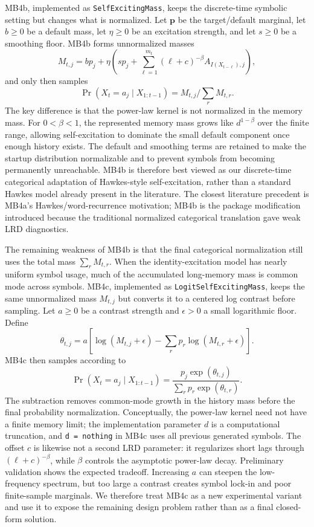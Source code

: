 \documentclass[journal]{IEEEtran}
\newcommand{\code}[1]{\texttt{#1}}
\newcommand{\vect}[1]{\boldsymbol{#1}}
\begin{document}
MB4b, implemented as \code{SelfExcitingMass}, keeps the discrete-time symbolic
setting but changes what is normalized. Let \(\vect{p}\) be the target/default
marginal, let $b\ge 0$ be a default mass, let \(\eta\ge 0\) be an excitation
strength, and let $s\ge 0$ be a smoothing floor. MB4b forms unnormalized masses
\begin{equation}
  M_{t,j} = b p_j + \eta\left(s p_j +
  \sum_{\ell=1}^{m_t} (\ell+c)^{-\beta} A_{I(X_{t-\ell}),j}\right),
\end{equation}
and only then samples
\begin{equation}
  \Pr(X_t=a_j\mid X_{1:t-1}) = M_{t,j}/\sum_r M_{t,r}.
\end{equation}
The key difference is that the power-law kernel is not normalized in the memory
mass. For \(0<\beta<1\), the represented memory mass grows like
\(d^{1-\beta}\) over the finite range, allowing self-excitation to dominate the
small default component once enough history exists. The default and smoothing
terms are retained to make the startup distribution normalizable and to prevent
symbols from becoming permanently unreachable. MB4b is therefore best viewed as
our discrete-time categorical adaptation of Hawkes-style self-excitation, rather
than a standard Hawkes model already present in the literature. The closest
literature precedent is MB4a's Hawkes/word-recurrence motivation; MB4b is the
package modification introduced because the traditional normalized categorical
translation gave weak LRD diagnostics.

The remaining weakness of MB4b is that the final categorical normalization still
uses the total mass \(\sum_r M_{t,r}\). When the identity-excitation model has
nearly uniform symbol usage, much of the accumulated long-memory mass is common
mode across symbols. MB4c, implemented as \code{LogitSelfExcitingMass}, keeps the
same unnormalized mass \(M_{t,j}\) but converts it to a centered log contrast
before sampling. Let \(a\ge 0\) be a contrast strength and \(\epsilon>0\) a small
logarithmic floor. Define
\begin{equation}
  \theta_{t,j} = a\left[\log(M_{t,j}+\epsilon)
  - \sum_r p_r\log(M_{t,r}+\epsilon)\right].
\end{equation}
MB4c then samples according to
\begin{equation}
  \Pr(X_t=a_j\mid X_{1:t-1}) =
  \frac{p_j\exp(\theta_{t,j})}{\sum_r p_r\exp(\theta_{t,r})}.
\end{equation}
The subtraction removes common-mode growth in the history mass before the final
probability normalization. Conceptually, the power-law kernel need not have a
finite memory limit; the implementation parameter \(d\) is a computational
truncation, and \code{d = nothing} in MB4c uses all previous generated symbols.
The offset \(c\) is likewise not a second LRD parameter: it regularizes short
lags through \((\ell+c)^{-\beta}\), while \(\beta\) controls the asymptotic
power-law decay. Preliminary validation shows the expected tradeoff. Increasing
\(a\) can steepen the low-frequency spectrum, but too large a contrast creates
symbol lock-in and poor finite-sample marginals. We therefore treat MB4c as a
new experimental variant and use it to expose the remaining design problem rather
than as a final closed-form solution.
\end{document}
